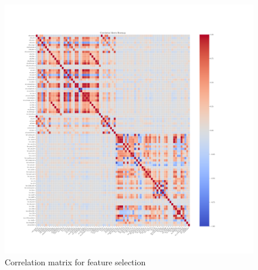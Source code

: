 \begin{figure}[!htbp]
	\centering
	\includegraphics[width=\columnwidth]{images/correlation_matrix_heatmap.pdf}
	\caption{Correlation matrix for feature selection}
	\label{fig:netwrok}
\end{figure}



\newpage
